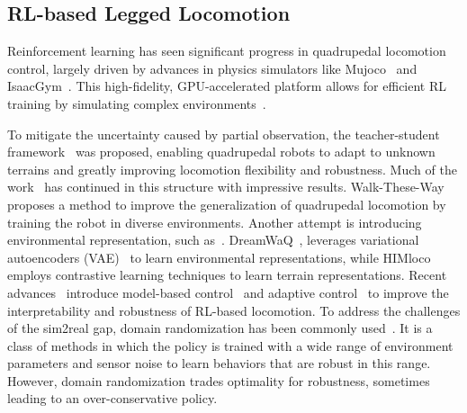 \subsection{RL-based Legged Locomotion}
Reinforcement learning has seen significant progress in quadrupedal locomotion control, largely driven by advances in physics simulators like Mujoco~\cite{todorov2012mujoco} and IsaacGym~\cite{makoviychuk2021isaac}. This high-fidelity, GPU-accelerated platform allows for efficient RL training by simulating complex environments~\cite{rudin2022learningwalkminutesusing}.  

To mitigate the uncertainty caused by partial observation, the teacher-student framework~\cite{kumar2021rma, doi:10.1126/scirobotics.abc5986} was proposed, enabling quadrupedal robots to adapt to unknown terrains and greatly improving locomotion flexibility and robustness. Much of the work~\cite{pmlr-v205-agarwal23a, Cheng2024parkour, kumar2022adapting} has continued in this structure with impressive results.
Walk-These-Way~\cite{margolis2023walk} proposes a method to improve the generalization of quadrupedal locomotion by training the robot in diverse environments.
Another attempt is introducing environmental representation, such as~\cite{ji2022concurrent, nahrendra2023dreamwaq, long2024him}.
DreamWaQ~\cite{nahrendra2023dreamwaq}, leverages variational autoencoders (VAE)~\cite{higgins2016beta} to learn environmental representations, while HIMloco~\cite{long2024him} employs contrastive learning techniques to learn terrain representations.
Recent advances~\cite{lyu2023composite, lyu2024rl2ac} introduce model-based control~\cite{kim2019highly} and adaptive control~\cite{ioannou1996robust} to improve the interpretability and robustness of RL-based locomotion.
To address the challenges of the sim2real gap, domain randomization has been commonly used~\cite{xie2021dynamics, tan2018sim, kumar2021rma, nahrendra2023dreamwaq, long2024him}.
It is a class of methods in which the policy is trained with a wide range of environment parameters and sensor noise to learn behaviors that are robust in this range. However, domain randomization trades optimality for robustness, sometimes leading to an over-conservative policy.

